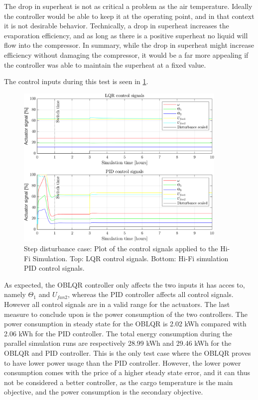 The drop in superheat is not as critical a problem as the air temperature. Ideally the controller would be able to keep it at the operating point, and in that context it is not desirable behavior. Technically, a drop in superheat increases the evaporation efficiency, and as long as there is a positive superheat no liquid will flow into the compressor. In summary, while the drop in superheat might increase efficiency without damaging the compressor, it would be a far more appealing if the controller was able to maintain the superheat at a fixed value.

The control inputs during this test is seen in \cref{fig:inputs_stepDist}.

\begin{figure}[H]
	\centering
	\includegraphics[width=0.9\textwidth]{Graphics/fig_inputs_stepDist.png}
	\caption{Step disturbance case: Plot of the control signals applied to the Hi-Fi Simulation. Top: LQR control signals. Bottom: Hi-Fi simulation PID control signals.}
	\label{fig:inputs_stepDist}
\end{figure}

As expected, the OBLQR controller only affects the two inputs it has acces to, namely $ \Theta_1 $ and $ U_{fan2} $, whereas the PID controller affects all control signals. However all control signals are in a valid range for the actuators.
The last measure to conclude upon is the power consumption of the two controllers. The power consumption in steady state for the OBLQR is 2.02 \si{kWh} compared with 2.06 \si{kWh} for the PID controller. The total energy consumption during the parallel simulation runs are respectively 28.99 \si{kWh} and 29.46 \si{kWh} for the OBLQR and PID controller.
This is the only test case where the OBLQR proves to have lower power usage than the PID controller. However, the lower power consumption comes with the price of a higher steady state error, and it can thus not be considered a better controller, as the cargo temperature is the main objective, and the power consumption is the secondary objective. 

